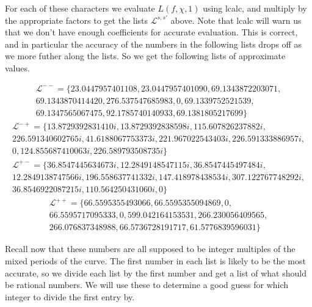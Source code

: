 For each of these characters we evaluate $L(f, \chi, 1)$ using lcalc, and multiply by the appropriate
factors to get the lists $\mathcal{L}^{s,s'}$ above. Note that lcalc will warn us
that we don't have enough coefficients for accurate evaluation. This is correct, and in particular the
accuracy of the numbers in the following lists drops off as we more futher along the lists. So we
get the following lists of approximate values.

\begin{multline}
\mathcal{L}^{--} = \big\{23.0447957401108,
23.0447957401090,
69.1343872203071,
\\69.1343870414420,
276.537547685983,
0,
69.1339752521539,
\\69.1347565067475,
92.1785740140933,
69.1381805217699\big\}
\end{multline}
\begin{multline}
\mathcal{L}^{-+} = \big\{13.8729392831410i,
13.8729392838598i,
115.607826237882i,
\\226.591340602765i,
41.6188067753373i,
221.967022543403i,
226.591333886957i,
\\0,
124.855687410063i,
226.589793508735i\big\}
\end{multline}
\begin{multline}
\mathcal{L}^{+-} = \big\{36.8547445634673i,
12.2849148547115i,
36.8547445497484i,
\\12.2849138747566i,
196.558637741332i,
147.418978438534i,
307.122767748292i,
\\36.8546922087215i,
110.564250431060i,
0\big\}
\end{multline}
\begin{multline}
\mathcal{L}^{++} = \big\{66.5595355493066,
66.5595355094869,
0,
\\66.5595717095333,
0,
599.042164153531,
266.230056409565,
\\266.076837348988,
66.5736728191717,
61.5776839596031\big\}
\end{multline}

Recall now that these numbers are all supposed to be integer multiples of the mixed periods of the
curve. The first number in each list is likely to be the most accurate, so we divide each list by the
first number and get a list of what should be rational numbers. We will use these to determine a good guess
for which integer to divide the first entry by.

